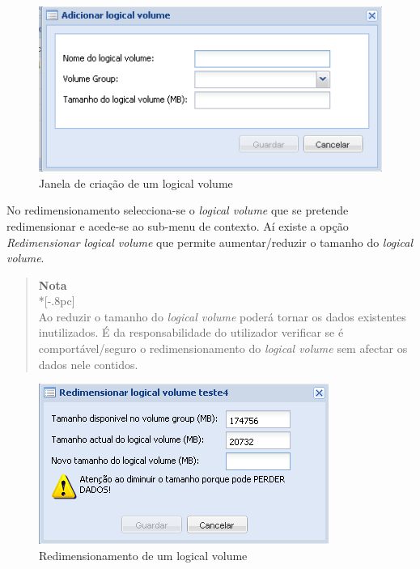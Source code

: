 \begin{figure}[H]
        \begin{center}
        \includegraphics[scale=0.5]{screenshots/storage_lv_create.png}
        \caption{Janela de criação de um logical volume}
        \label{fig:storage_lv_create}
        \end{center}
\end{figure}

No redimensionamento selecciona-se o \emph{logical volume} que se pretende redimensionar e acede-se ao sub-menu de contexto. Aí existe a opção \emph{Redimensionar logical volume} que permite aumentar/reduzir o tamanho do \emph{logical volume}.


\begin{quote}
	{\large \bf Nota} \\*[-.8pc]
	\underline{\hspace{6in}} \\
	Ao reduzir o tamanho do \emph{logical volume} poderá tornar os dados existentes inutilizados. É da responsabilidade do utilizador verificar se é comportável/seguro o redimensionamento do \emph{logical volume} sem afectar os dados nele contidos.
\end{quote}


\begin{figure}[H]
        \begin{center}
        \includegraphics[scale=0.5]{screenshots/storage_lv_resize.png}
        \caption{Redimensionamento de um logical volume}
        \label{fig:storage_lv_resize}
        \end{center}
\end{figure}

